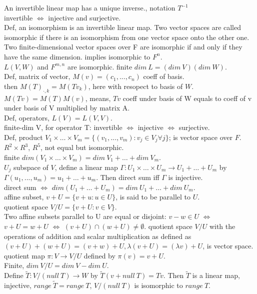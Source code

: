 \documentclass[paper=a4, fontsize=11pt]{scrartcl} %
\numberwithin{equation}{section} %
\numberwithin{figure}{section} %
\numberwithin{table}{section} %
\begin{document}
An invertible linear map has a unique inverse., notation $T^{-1}$\\
invertible $\Leftrightarrow$ injective and surjective.\\
Def, an isomorphism is an invertible linear map. Two vector spaces are called isomorphic if there is an isomorphism from one vector space onto the other one.\\
Two finite-dimensional vector spaces over F are isomorphic if and only if they have the same dimension. implies isomorphic to $F^n$.\\
$L(V,W)$ and $F^{m,n}$ are isomorphic. finite $dim\ L = (dim\ V)(dim\ W)$.\\
Def, matrix of vector, $M(v) = (c_1,...,c_n)$ coeff of basis.\\
then ${M(T)}_{\cdot,k} = M(Tv_k)$, here with resopect to basis of $W$.\\
$M(Tv) = M(T)M(v)$, means, $Tv$ coeff under basis of W equals to coeff of v under basis of V multiplied by matrix A.\\
Def, operators, $L(V) = L(V,V)$.\\
finite-dim V, for operator T: invertible $\Leftrightarrow$ injective $\Leftrightarrow$ surjective.\\
Def, product $V_1 \times\dots\times V_m = \{(v_1,...,v_m): v_j\in V_j \forall j\}$; is vector space over $F$.\\
$R^2\times R^3$, $R^5$, not equal but isomorphic.\\
finite $dim(V_1 \times\dots\times V_m) = dim\ V_1 + \dots + dim\ V_m$.\\
$U_j$ subspace of $V$, define a linear map $\Gamma: U_1 \times \dots\times U_m \rightarrow U_1+\dots +U_m$ by $\Gamma(u_1,...,u_m)=u_1+\dots+u_m$. Then direct sum iff $\Gamma$ is injective.\\
direct sum $\Leftrightarrow$ $dim(U_1+\dots +U_m) = dim\ U_1+ \dots + dim\ U_m$.\\
affine subset, $v+U =\{v+u: u\in U\}$, is said to be parallel to $U$.\\
quotient space $V/U = \{v+U: v\in V\}$.\\
Two affine subsets parallel to U are equal or disjoint: $v-w\in U$ $\Leftrightarrow$ $v+U=w+U$ $\Leftrightarrow$ $(v+U)\cap (w+U)\neq\emptyset$.
quotient space $V/U$ with the operations of addition and scalar multiplication as defined as $(v+U) +(w+U) = (v+w) +U, \lambda(v+U) = (\lambda v) +U$, is vector space.\\
quotient map $\pi: V\rightarrow V/U$ defined by $\pi(v)=v+U$.\\
Finite, $dim\ V/U = dim\ V - dim\ U$.\\
Define $\tilde{T}: V/(null\ T) \rightarrow W$ by $\tilde{T}(v+null\ T)= Tv$. Then $\tilde{T}$ is a linear map, injective, $range\ \tilde{T} = range\ T$, $V/(null\ T)$ is isomorphic to $range\ T$.
\end{document}
